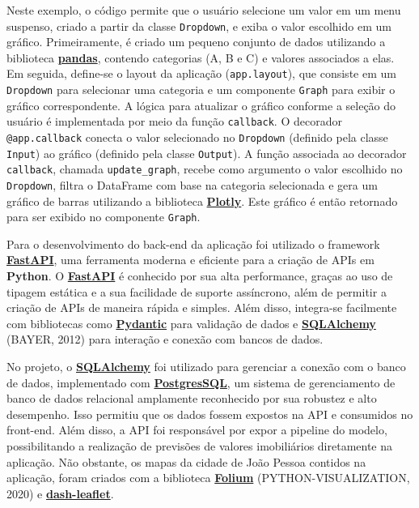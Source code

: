 \documentclass[
  12pt,
  a4paper,
]{scrreprt}
\begin{document}
Neste exemplo, o código permite que o usuário selecione um valor em um
menu suspenso, criado a partir da classe \texttt{Dropdown}, e exiba o
valor escolhido em um gráfico. Primeiramente, é criado um pequeno
conjunto de dados utilizando a biblioteca
\href{https://pandas.pydata.org/}{\textbf{pandas}}, contendo categorias
(A, B e C) e valores associados a elas. Em seguida, define-se o layout
da aplicação (\texttt{app.layout}), que consiste em um \texttt{Dropdown}
para selecionar uma categoria e um componente \texttt{Graph} para exibir
o gráfico correspondente. A lógica para atualizar o gráfico conforme a
seleção do usuário é implementada por meio da função \texttt{callback}.
O decorador \texttt{@app.callback} conecta o valor selecionado no
\texttt{Dropdown} (definido pela classe \texttt{Input}) ao gráfico
(definido pela classe \texttt{Output}). A função associada ao decorador
\texttt{callback}, chamada \texttt{update\_graph}, recebe como argumento
o valor escolhido no \texttt{Dropdown}, filtra o DataFrame com base na
categoria selecionada e gera um gráfico de barras utilizando a
biblioteca \href{https://plotly.com/}{\textbf{Plotly}}. Este gráfico é
então retornado para ser exibido no componente \texttt{Graph}.

\vspace{12pt}

Para o desenvolvimento do back-end da aplicação foi utilizado o
framework \href{https://fastapi.tiangolo.com/}{\textbf{FastAPI}}, uma
ferramenta moderna e eficiente para a criação de APIs em
\textbf{Python}. O
\href{https://fastapi.tiangolo.com/}{\textbf{FastAPI}} é conhecido por
sua alta performance, graças ao uso de tipagem estática e a sua
facilidade de suporte assíncrono, além de permitir a criação de APIs de
maneira rápida e simples. Além disso, integra-se facilmente com
bibliotecas como
\href{https://docs.pydantic.dev/latest/}{\textbf{Pydantic}} para
validação de dados e
\href{https://www.sqlalchemy.org/}{\textbf{SQLAlchemy}} (BAYER, 2012)
para interação e conexão com bancos de dados.

\vspace{12pt}

No projeto, o \href{https://www.sqlalchemy.org/}{\textbf{SQLAlchemy}}
foi utilizado para gerenciar a conexão com o banco de dados,
implementado com
\href{https://www.postgresql.org/}{\textbf{PostgresSQL}}, um sistema de
gerenciamento de banco de dados relacional amplamente reconhecido por
sua robustez e alto desempenho. Isso permitiu que os dados fossem
expostos na API e consumidos no front-end. Além disso, a API foi
responsável por expor a pipeline do modelo, possibilitando a realização
de previsões de valores imobiliários diretamente na aplicação. Não
obstante, os mapas da cidade de João Pessoa contidos na aplicação, foram
criados com a biblioteca
\href{https://python-visualization.github.io/folium/latest/}{\textbf{Folium}}
(PYTHON-VISUALIZATION, 2020) e
\href{https://www.dash-leaflet.com/}{\textbf{dash-leaflet}}.
\end{document}
